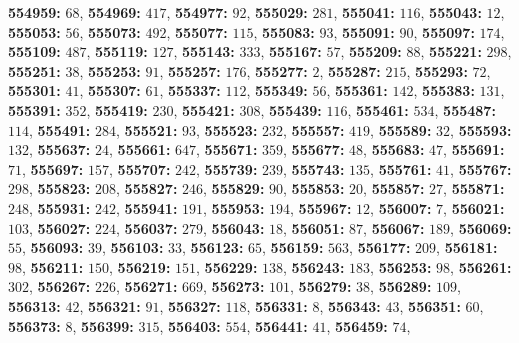 \textsf{\bfseries 554959:} $68$, \textsf{\bfseries 554969:} $417$, \textsf{\bfseries 554977:} $92$, \textsf{\bfseries 555029:} $281$, \textsf{\bfseries 555041:} $116$, \textsf{\bfseries 555043:} $12$, \textsf{\bfseries 555053:} $56$, \textsf{\bfseries 555073:} $492$, \textsf{\bfseries 555077:} $115$, \textsf{\bfseries 555083:} $93$, \textsf{\bfseries 555091:} $90$, \textsf{\bfseries 555097:} $174$, \textsf{\bfseries 555109:} $487$, \textsf{\bfseries 555119:} $127$, \textsf{\bfseries 555143:} $333$, \textsf{\bfseries 555167:} $57$, \textsf{\bfseries 555209:} $88$, \textsf{\bfseries 555221:} $298$, \textsf{\bfseries 555251:} $38$, \textsf{\bfseries 555253:} $91$, \textsf{\bfseries 555257:} $176$, \textsf{\bfseries 555277:} $2$, \textsf{\bfseries 555287:} $215$, \textsf{\bfseries 555293:} $72$, \textsf{\bfseries 555301:} $41$, \textsf{\bfseries 555307:} $61$, \textsf{\bfseries 555337:} $112$, \textsf{\bfseries 555349:} $56$, \textsf{\bfseries 555361:} $142$, \textsf{\bfseries 555383:} $131$, \textsf{\bfseries 555391:} $352$, \textsf{\bfseries 555419:} $230$, \textsf{\bfseries 555421:} $308$, \textsf{\bfseries 555439:} $116$, \textsf{\bfseries 555461:} $534$, \textsf{\bfseries 555487:} $114$, \textsf{\bfseries 555491:} $284$, \textsf{\bfseries 555521:} $93$, \textsf{\bfseries 555523:} $232$, \textsf{\bfseries 555557:} $419$, \textsf{\bfseries 555589:} $32$, \textsf{\bfseries 555593:} $132$, \textsf{\bfseries 555637:} $24$, \textsf{\bfseries 555661:} $647$, \textsf{\bfseries 555671:} $359$, \textsf{\bfseries 555677:} $48$, \textsf{\bfseries 555683:} $47$, \textsf{\bfseries 555691:} $71$, \textsf{\bfseries 555697:} $157$, \textsf{\bfseries 555707:} $242$, \textsf{\bfseries 555739:} $239$, \textsf{\bfseries 555743:} $135$, \textsf{\bfseries 555761:} $41$, \textsf{\bfseries 555767:} $298$, \textsf{\bfseries 555823:} $208$, \textsf{\bfseries 555827:} $246$, \textsf{\bfseries 555829:} $90$, \textsf{\bfseries 555853:} $20$, \textsf{\bfseries 555857:} $27$, \textsf{\bfseries 555871:} $248$, \textsf{\bfseries 555931:} $242$, \textsf{\bfseries 555941:} $191$, \textsf{\bfseries 555953:} $194$, \textsf{\bfseries 555967:} $12$, \textsf{\bfseries 556007:} $7$, \textsf{\bfseries 556021:} $103$, \textsf{\bfseries 556027:} $224$, \textsf{\bfseries 556037:} $279$, \textsf{\bfseries 556043:} $18$, \textsf{\bfseries 556051:} $87$, \textsf{\bfseries 556067:} $189$, \textsf{\bfseries 556069:} $55$, \textsf{\bfseries 556093:} $39$, \textsf{\bfseries 556103:} $33$, \textsf{\bfseries 556123:} $65$, \textsf{\bfseries 556159:} $563$, \textsf{\bfseries 556177:} $209$, \textsf{\bfseries 556181:} $98$, \textsf{\bfseries 556211:} $150$, \textsf{\bfseries 556219:} $151$, \textsf{\bfseries 556229:} $138$, \textsf{\bfseries 556243:} $183$, \textsf{\bfseries 556253:} $98$, \textsf{\bfseries 556261:} $302$, \textsf{\bfseries 556267:} $226$, \textsf{\bfseries 556271:} $669$, \textsf{\bfseries 556273:} $101$, \textsf{\bfseries 556279:} $38$, \textsf{\bfseries 556289:} $109$, \textsf{\bfseries 556313:} $42$, \textsf{\bfseries 556321:} $91$, \textsf{\bfseries 556327:} $118$, \textsf{\bfseries 556331:} $8$, \textsf{\bfseries 556343:} $43$, \textsf{\bfseries 556351:} $60$, \textsf{\bfseries 556373:} $8$, \textsf{\bfseries 556399:} $315$, \textsf{\bfseries 556403:} $554$, \textsf{\bfseries 556441:} $41$, \textsf{\bfseries 556459:} $74$, 
